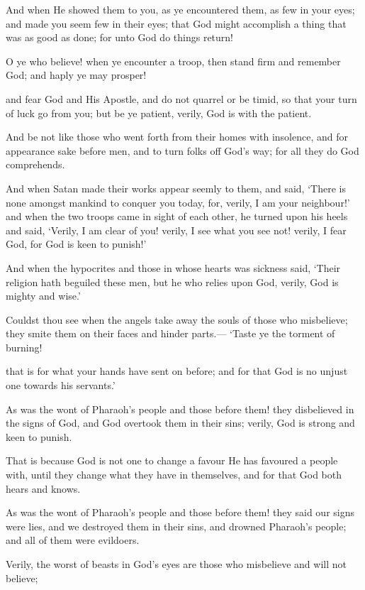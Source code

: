\documentclass[fontsize=14pt, letterpaper, notitlepage, openany, DIV=12]{scrbook} %
\begin{document}
\noindent[8:44]
And when He showed them to you, as ye encountered them, as few in your eyes; and
made you seem few in their eyes; that God might accomplish a thing that was as good as done;
for unto God do things return!

\noindent[8:45]
O ye who believe! when ye encounter a troop, then stand firm and remember God; and
haply ye may prosper!

\noindent[8:46]
and fear God and His Apostle, and do not quarrel or be timid, so that your turn of luck go
from you; but be ye patient, verily, God is with the patient.

\noindent[8:47]
And be not like those who went forth from their homes with insolence, and for
appearance sake before men, and to turn folks off God's way; for all they do God comprehends.

\noindent[8:48]
And when Satan made their works appear seemly to them, and said, `There is none
amongst mankind to conquer you today, for, verily, I am your neighbour!' and when the two
troops came in sight of each other, he turned upon his heels and said, `Verily, I am clear of you!
verily, I see what you see not! verily, I fear God, for God is keen to punish!'

\noindent[8:49]
And when the hypocrites and those in whose hearts was sickness said, `Their religion
hath beguiled these men, but he who relies upon God, verily, God is mighty and wise.'

\noindent[8:50]
Couldst thou see when the angels take away the souls of those who misbelieve; they
smite them on their faces and hinder parts.--- `Taste ye the torment of burning!

\noindent[8:51]
that is for what your hands have sent on before; and for that God is no unjust one towards
his servants.'

\noindent[8:52]
As was the wont of Pharaoh's people and those before them! they disbelieved in the signs
of God, and God overtook them in their sins; verily, God is strong and keen to punish.

\noindent[8:53]
That is because God is not one to change a favour He has favoured a people with, until
they change what they have in themselves, and for that God both hears and knows.

\noindent[8:54]
As was the wont of Pharaoh's people and those before them! they said our signs were
lies, and we destroyed them in their sins, and drowned Pharaoh's people; and all of them were
evildoers.

\noindent[8:55]
Verily, the worst of beasts in God's eyes are those who misbelieve and will not believe;
\end{document}
